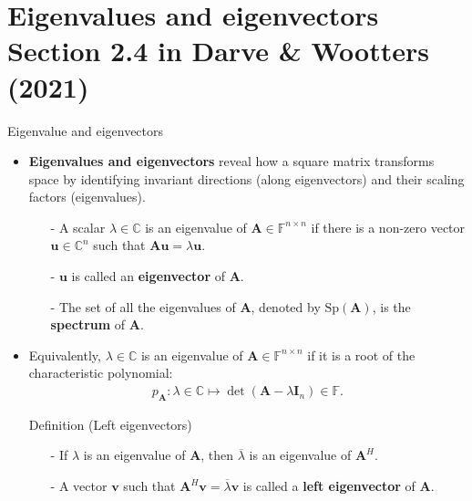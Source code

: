 \documentclass[t,usepdftitle=false]{beamer}
\begin{document}
\section{Eigenvalues and eigenvectors\\{\small Section 2.4 in Darve \& Wootters (2021)}}

\begin{frame}{Eigenvalue and eigenvectors}
\begin{itemize}
\item \textbf{Eigenvalues and eigenvectors} reveal how a square matrix transforms space by identifying invariant directions (along eigenvectors) and their scaling factors (eigenvalues).
\begin{definition}
\begin{itemize}
\item[-] A scalar $\lambda\in\mathbb{C}$ is an eigenvalue of $\mathbf{A}\in\mathbb{F}^{n\times n}$ if there is a non-zero vector $\mathbf{u}\in\mathbb{C}^n$ such that $\mathbf{A}\mathbf{u}=\lambda\mathbf{u}$.\vspace{-.12cm}
\item[-] $\mathbf{u}$ is called an \textbf{eigenvector} of $\mathbf{A}$.\vspace{-.12cm}
\item[-] The set of all the eigenvalues of $\mathbf{A}$, denoted by $\mathrm{Sp}(\mathbf{A})$, is the \textbf{spectrum} of $\mathbf{A}$.
\end{itemize}
\end{definition}
\item Equivalently, $\lambda\in\mathbb{C}$ is an eigenvalue of $\mathbf{A}\in\mathbb{F}^{n\times n}$ if it is a root of the characteristic polynomial:
\begin{align*}
p_{\mathbf{A}}:\lambda\in\mathbb{C}\mapsto\det(\mathbf{A}-\lambda\mathbf{I}_n)\in\mathbb{F}.
\end{align*}
\vspace{-.5cm}
\begin{block}{Definition (Left eigenvectors)}
\begin{itemize}
\item[-] If $\lambda$ is an eigenvalue of $\mathbf{A}$, then $\overline{\lambda}$ is an eigenvalue of $\mathbf{A}^H$.\vspace{-.12cm}
\item[-] A vector $\mathbf{v}$ such that $\mathbf{A}^H\mathbf{v}=\overline{\lambda}\mathbf{v}$ is called a \textbf{left eigenvector} of $\mathbf{A}$.
\end{itemize}
\end{block}
\end{itemize}
\end{frame}
\end{document}

